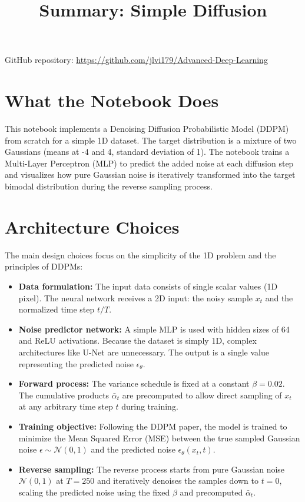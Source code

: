 \documentclass[11pt,a4paper]{article}
\title{Summary: Simple Diffusion}
\author{}
\date{}
\begin{document}
\maketitle

\noindent GitHub repository: \href{https://github.com/jlvi179/Advanced-Deep-Learning}{https://github.com/jlvi179/Advanced-Deep-Learning}

\section*{What the Notebook Does}

This notebook implements a Denoising Diffusion Probabilistic Model (DDPM) from scratch for a simple 1D dataset. The target distribution is a mixture of two Gaussians (means at -4 and 4, standard deviation of 1). The notebook trains a Multi-Layer Perceptron (MLP) to predict the added noise at each diffusion step and visualizes how pure Gaussian noise is iteratively transformed into the target bimodal distribution during the reverse sampling process.

\section*{Architecture Choices}

The main design choices focus on the simplicity of the 1D problem and the principles of DDPMs:

\begin{itemize}
    \item \textbf{Data formulation:} The input data consists of single scalar values (1D pixel). The neural network receives a 2D input: the noisy sample $x_t$ and the normalized time step $t / T$.
    \item \textbf{Noise predictor network:} A simple MLP is used with hidden sizes of 64 and ReLU activations. Because the dataset is simply 1D, complex architectures like U-Net are unnecessary. The output is a single value representing the predicted noise $\epsilon_\theta$.
    \item \textbf{Forward process:} The variance schedule is fixed at a constant $\beta = 0.02$. The cumulative products $\bar{\alpha}_t$ are precomputed to allow direct sampling of $x_t$ at any arbitrary time step $t$ during training.
    \item \textbf{Training objective:} Following the DDPM paper, the model is trained to minimize the Mean Squared Error (MSE) between the true sampled Gaussian noise $\epsilon \sim \mathcal{N}(0, 1)$ and the predicted noise $\epsilon_\theta(x_t, t)$.
    \item \textbf{Reverse sampling:} The reverse process starts from pure Gaussian noise $\mathcal{N}(0, 1)$ at $T=250$ and iteratively denoises the samples down to $t=0$, scaling the predicted noise using the fixed $\beta$ and precomputed $\bar{\alpha}_t$.
\end{itemize}
\end{document}
